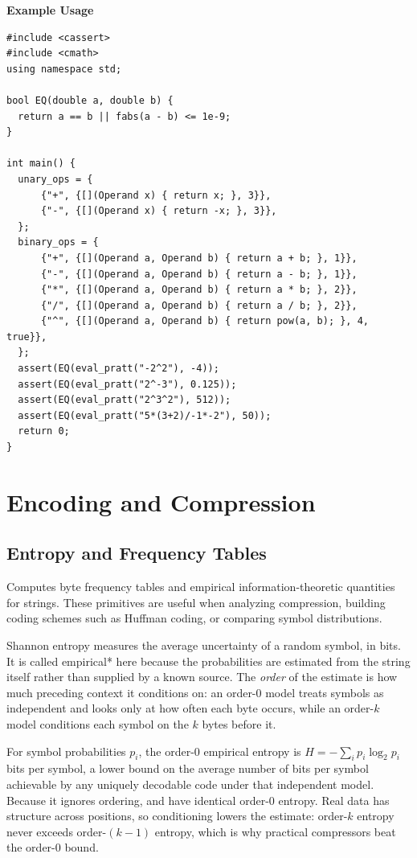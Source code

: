\textbf{Example Usage}\par
\begin{lstlisting}[style=cpp]
#include <cassert>
#include <cmath>
using namespace std;

bool EQ(double a, double b) {
  return a == b || fabs(a - b) <= 1e-9;
}

int main() {
  unary_ops = {
      {"+", {[](Operand x) { return x; }, 3}},
      {"-", {[](Operand x) { return -x; }, 3}},
  };
  binary_ops = {
      {"+", {[](Operand a, Operand b) { return a + b; }, 1}},
      {"-", {[](Operand a, Operand b) { return a - b; }, 1}},
      {"*", {[](Operand a, Operand b) { return a * b; }, 2}},
      {"/", {[](Operand a, Operand b) { return a / b; }, 2}},
      {"^", {[](Operand a, Operand b) { return pow(a, b); }, 4, true}},
  };
  assert(EQ(eval_pratt("-2^2"), -4));
  assert(EQ(eval_pratt("2^-3"), 0.125));
  assert(EQ(eval_pratt("2^3^2"), 512));
  assert(EQ(eval_pratt("5*(3+2)/-1*-2"), 50));
  return 0;
}
\end{lstlisting}

\section{\texorpdfstring{Encoding and Compression}{3.8 Encoding and Compression}}
\setcounter{section}{8}
\setcounter{subsection}{0}
\subsection{Entropy and Frequency Tables}
\label{sec:3.8.1}
Computes byte frequency tables and empirical information-theoretic quantities for strings. These primitives are useful when analyzing compression, building coding schemes such as Huffman coding, or comparing symbol distributions.

Shannon entropy measures the average uncertainty of a random symbol, in bits. It is called empirical* here because the probabilities are estimated from the string itself rather than supplied by a known source. The \textit{order} of the estimate is how much preceding context it conditions on: an order-0 model treats symbols as independent and looks only at how often each byte occurs, while an order-$k$ model conditions each symbol on the $k$ bytes before it.

For symbol probabilities $p_i$, the order-0 empirical entropy is $H = -\sum_i p_i \log_2 p_i$ bits per symbol, a lower bound on the average number of bits per symbol achievable by any uniquely decodable code under that independent model. Because it ignores ordering,  and  have identical order-0 entropy. Real data has structure across positions, so conditioning lowers the estimate: order-$k$ entropy never exceeds order-$(k - 1)$ entropy, which is why practical compressors beat the order-0 bound.

